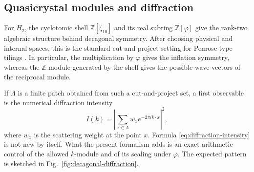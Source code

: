 \documentclass[12pt,oneside,english]{amsart}
\numberwithin{equation}{section}
\numberwithin{figure}{section}
\numberwithin{table}{section}
\theoremstyle{plain}
\theoremstyle{definition}
\theoremstyle{remark}
\newcommand{\ZZ}{\mathbb Z}
\newcommand{\Zphi}{\mathbb Z[\varphi]}
\begin{document}
\subsection{Quasicrystal modules and diffraction}

For \(H_2\), the cyclotomic shell \(\ZZ[\zeta_{10}]\) and its real subring \(\Zphi\) give the rank-two algebraic structure behind decagonal symmetry. After choosing physical and internal spaces, this is the standard cut-and-project setting for Penrose-type tilings \cite{DeBr81,Pen89,Aperiodic}. In particular, the multiplication by \(\varphi\) gives the inflation symmetry, whereas the \(\ZZ\)-module generated by the shell gives the possible wave-vectors of the reciprocal module.

If \(\Lambda\) is a finite patch obtained from such a cut-and-project set, a first observable is the numerical diffraction intensity
\begin{equation}
I(k)=\left|\sum_{x\in\Lambda}w_x e^{-2\pi i k\cdot x}\right|^2,
\label{eq:diffraction-intensity}
\end{equation}
where \(w_x\) is the scattering weight at the point \(x\). Formula \eqref{eq:diffraction-intensity} is not new by itself. What the present formalism adds is an exact arithmetic control of the allowed \(k\)-module and of its scaling under \(\varphi\). The expected pattern is sketched in Fig.~\ref{fig:decagonal-diffraction}.
\end{document}
